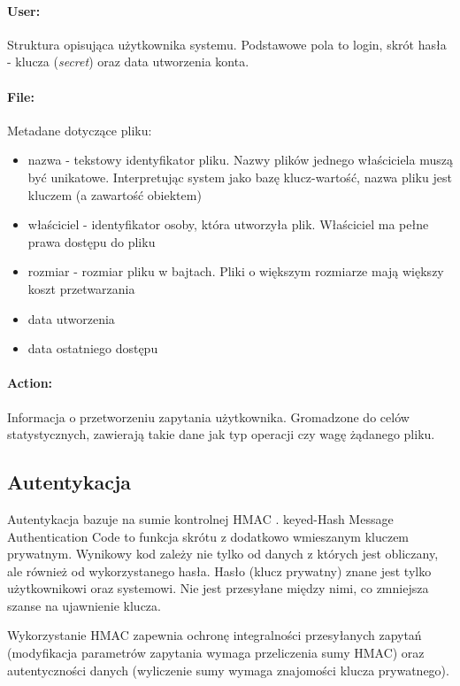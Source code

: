 \paragraph{User:} Struktura opisująca użytkownika systemu. Podstawowe pola to login, skrót hasła - klucza (\textit{secret}) oraz data utworzenia konta.

\paragraph{File:} Metadane dotyczące pliku:
\begin{itemize}
	\item nazwa - tekstowy identyfikator pliku. Nazwy plików jednego właściciela muszą być unikatowe. Interpretując system jako bazę klucz-wartość, nazwa pliku jest kluczem (a zawartość obiektem)
	\item właściciel - identyfikator osoby, która utworzyła plik. Właściciel ma pełne prawa dostępu do pliku
	\item rozmiar - rozmiar pliku w bajtach. Pliki o większym rozmiarze mają większy koszt przetwarzania
	\item data utworzenia
	\item data ostatniego dostępu
\end{itemize}

\paragraph{Action:} Informacja o przetworzeniu zapytania użytkownika. Gromadzone do celów statystycznych, zawierają takie dane jak typ operacji czy wagę żądanego pliku.

\subsection{Autentykacja}
Autentykacja bazuje na sumie kontrolnej HMAC \cite{hmac-art}. keyed-Hash Message Authentication Code to funkcja skrótu z dodatkowo wmieszanym kluczem prywatnym. Wynikowy kod zależy nie tylko od danych z których jest obliczany, ale również od wykorzystanego hasła. Hasło (klucz prywatny) znane jest tylko użytkownikowi oraz systemowi. Nie jest przesyłane między nimi, co zmniejsza szanse na ujawnienie klucza.

Wykorzystanie HMAC zapewnia ochronę integralności przesyłanych zapytań (modyfikacja parametrów zapytania wymaga przeliczenia sumy HMAC) oraz autentyczności danych (wyliczenie sumy wymaga znajomości klucza prywatnego).

